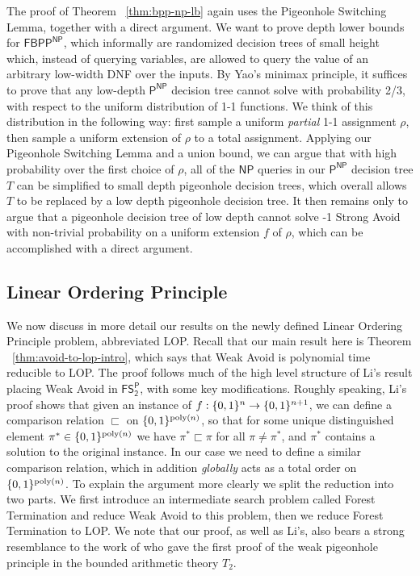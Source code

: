 The proof of Theorem ~\ref{thm:bpp-np-lb} again uses the Pigeonhole Switching Lemma, together with a direct argument. 
We want to prove depth lower bounds for $\mathsf{FBPP^{NP}}$, which informally are randomized decision trees of small height which, instead of querying variables, are allowed to query the value of an arbitrary low-width DNF over the inputs. 
By Yao's minimax principle, it suffices to prove that any low-depth $\mathsf{P^{NP}}$ decision tree cannot solve \avoid with probability 2/3, with respect to the uniform distribution of 1-1 functions. We think of this distribution in the following way: first sample a uniform \emph{partial} 1-1 assignment $\rho$, then sample a uniform extension of $\rho$ to a total assignment.
Applying our Pigeonhole Switching Lemma and a union bound, we can argue that with high probability over the first choice of $\rho$, all of the $\mathsf{NP}$ queries in our $\mathsf{P^{NP}}$ decision tree $T$ can be simplified to small depth pigeonhole decision trees, which overall allows $T$ to be replaced by a low depth pigeonhole decision tree. It then remains only to argue that a pigeonhole decision tree of low depth cannot solve {-1 Strong Avoid} with non-trivial probability on a uniform extension $f$ of $\rho$, which can be accomplished with a direct argument.

\subsection{Linear Ordering Principle}\label{sec:intro-lop}
 
We now discuss in more detail our results on the newly defined {\sc Linear Ordering Principle} problem, abbreviated {\sc LOP}. Recall that our main result here is Theorem ~\ref{thm:avoid-to-lop-intro}, which says that {\sc Weak Avoid} is polynomial time reducible to {\sc LOP}. The proof follows much of the high level structure of Li's result placing {\sc Weak Avoid} in $\mathsf{FS_2^P}$, with some key modifications. Roughly speaking, Li's proof shows that given an instance of \avoid $f: \{0,1\}^n \to \{0,1\}^{n+1}$, we can define a comparison relation $\sqsubset$ on $\{0,1\}^{\mathrm{poly}(n)}$, so that for some unique distinguished element $\pi^* \in\{0,1\}^{\mathrm{poly}(n)}$ we have $\pi^* \sqsubset \pi$ for all $\pi \neq \pi^*$, and $\pi^*$ contains a solution to the original \avoid instance. In our case we need to define a similar comparison relation, which in addition \emph{globally} acts as a total order on $\{0,1\}^{\mathrm{poly}(n)}$. To explain the argument more clearly we split the reduction into two parts. We first introduce an intermediate search problem called {\sc Forest Termination} and reduce {\sc Weak Avoid} to this problem, then we reduce {\sc Forest Termination} to {\sc LOP}.
We note that our proof, as well as Li's, also bears a strong resemblance to the work of \cite{Paris-Wilkie-Woods} who gave the first proof of the weak pigeonhole principle in the bounded arithmetic theory $T_2$.%


